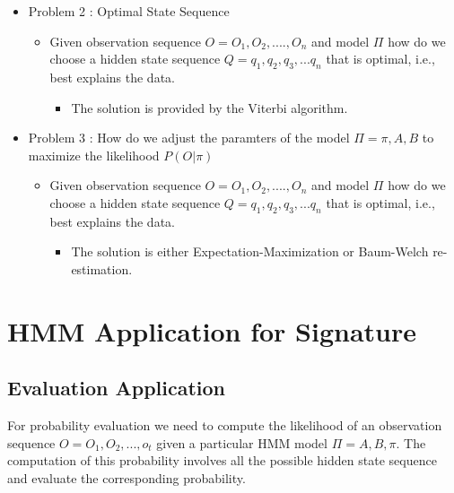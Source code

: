 \begin{itemize}
\item Problem 2 : Optimal State Sequence
 \begin{itemize}
 \item Given observation sequence $O = {O_1, O_2,....,}O_n$ and model $\Pi$ how do we choose a hidden state sequence $Q={q_1,q_2,q_3,...q_n}$
that is optimal, i.e., best explains the data. 
  \begin{itemize}
  \item The solution is provided by the Viterbi algorithm.
  \end{itemize}
 \end{itemize}
\end{itemize}



\begin{itemize}
\item Problem 3 : How do we adjust the paramters of the model $\Pi = {\pi, A, B}$ to maximize the likelihood $P(O|\pi)$ 
 \begin{itemize}
 \item Given observation sequence $O = {O_1, O_2,....,}O_n$ and model $\Pi$ how do we choose a hidden state sequence $Q={q_1,q_2,q_3,...q_n}$
that is optimal, i.e., best explains the data. 
  \begin{itemize}
  \item The solution is either Expectation-Maximization or Baum-Welch re-estimation.
  \end{itemize}
 \end{itemize}
\end{itemize}






\section{HMM Application for Signature}


\subsection{Evaluation Application}

For probability evaluation we need to compute the likelihood of an observation sequence $O = {O_1, O_2,...,o_t}$ given a particular HMM model $ \Pi = {A, B, \pi}$. The computation of this probability involves all the possible hidden state sequence and evaluate the corresponding probability. 


